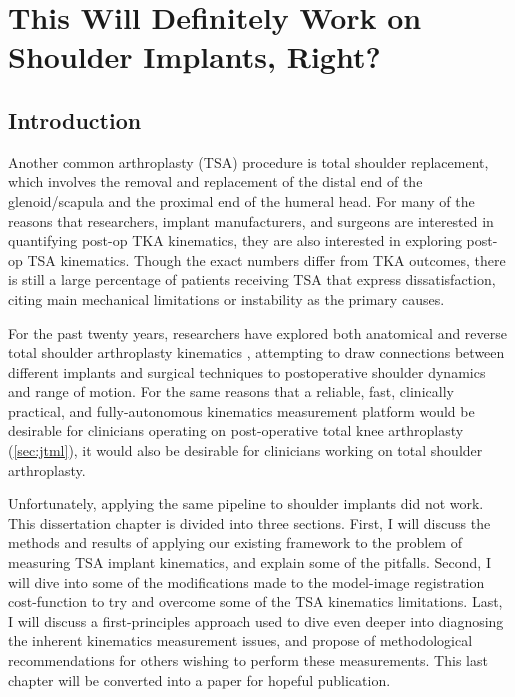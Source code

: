  \chapter{This Will Definitely Work on Shoulder Implants, Right?}

\section{Introduction}
Another common arthroplasty (TSA) procedure is total shoulder replacement, which involves the removal and replacement of the distal end of the glenoid/scapula and the proximal end of the humeral head.
For many of the reasons that researchers, implant manufacturers, and surgeons are interested in quantifying post-op TKA kinematics, they are also interested in exploring post-op TSA kinematics.
Though the exact numbers differ from TKA outcomes, there is still a large percentage of patients receiving TSA that express dissatisfaction, citing main mechanical limitations or instability as the primary causes.

For the past twenty years, researchers have explored both anatomical and reverse total shoulder arthroplasty kinematics \cite{kijimaVivo3dimensionalAnalysis2015,matsukiVivo3DAnalysis2014,matsukiDynamicVivoGlenohumeral2012,sugiComparingVivoThreedimensional2021,burtonFullyAutomaticTracking2023}, attempting to draw connections between different implants and surgical techniques to postoperative shoulder dynamics and range of motion.
For the same reasons that a reliable, fast, clinically practical, and fully-autonomous kinematics measurement platform would be desirable for clinicians operating on post-operative total knee arthroplasty (\cref{sec:jtml}), it would also be desirable for clinicians working on total shoulder arthroplasty.

Unfortunately, applying the same pipeline to shoulder implants did not work.
This dissertation chapter is divided into three sections.
First, I will discuss the methods and results of applying our existing framework to the problem of measuring TSA implant kinematics, and explain some of the pitfalls.
Second, I will dive into some of the modifications made to the model-image registration cost-function to try and overcome some of the TSA kinematics limitations.
Last, I will discuss a first-principles approach used to dive even deeper into diagnosing the inherent kinematics measurement issues, and propose of methodological recommendations for others wishing to perform these measurements. This last chapter will be converted into a paper for hopeful publication.

